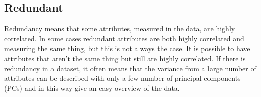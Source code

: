 \subsection*{Redundant}
%
Redundancy means that some attributes, measured in the data, are highly correlated. In some cases redundant attributes are both highly correlated and measuring the same thing, but this is not always the case. It is possible to have attributes that aren't the same thing but still are highly correlated. \blankline
%
If there is redundancy in a dataset, it often means that the variance from a large number of attributes can be described with only a few number of principal components (PCs) and in this way give an easy overview of the data. 